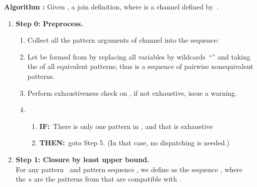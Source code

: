 \documentclass{LMCS}
\renewcommand{\_}{\mathord{\rule[-.25ex]{1ex}{.15ex}}}
\begin{document}
\medskip\noindent \textbf{Algorithm :}
Given , a join definition, where  is a channel defined by~.
\begin{enumerate}[\ ]
\item {\bf Step 0: Preprocess.} \hspace*{1cm}
  \begin{enumerate}[(1)]
  \item Collect all the pattern arguments of channel  into the
    sequence: 
  \item Let  be formed from  by replacing all
    variables by wildcards~``'' and taking the  of all
    equivalent patterns; thus  is a sequence of pairwise
    nonequivalent patterns.
  \item Perform exhaustiveness check on , if not exhaustive,
    issue a warning.
  \item
\begin{enumerate}[\ ]
    \item {\bf IF:}\ There is only one pattern in , and that
       is exhaustive
    \item {\bf THEN:}\ goto Step 5. (In that case, no dispatching is needed.)
    \end{enumerate}
  \end{enumerate}
\item {\bf Step 1: Closure by least upper bound.} \hspace*{1cm} \\
  For any pattern~ and pattern sequence , we define  as the sequence
  , where the \,s are the patterns from
   that are compatible with .


\end{enumerate}
\end{document}
